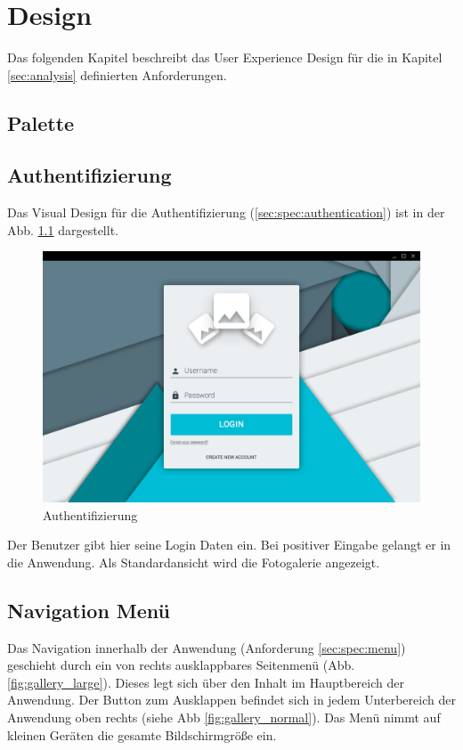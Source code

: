 \chapter{Design}

Das folgenden Kapitel beschreibt das User Experience Design für die in Kapitel \ref{sec:analysis} definierten Anforderungen.

\section{Palette}

\section{Authentifizierung}

Das Visual Design für die Authentifizierung (\ref{sec:spec:authentication}) ist in der Abb. \ref{fig:login_form} dargestellt.

\begin{figure}[htp]     %
\centering
\includegraphics[width=1.0\textwidth]{images/login_form} 
\caption{Authentifizierung}\label{fig:login_form}
\end{figure}

Der Benutzer gibt hier seine Login Daten ein. Bei positiver Eingabe gelangt er in die Anwendung. Als Standardansicht wird die Fotogalerie angezeigt.

\section{Navigation Menü}
\label{sec:des:navigation_menu}

Das Navigation innerhalb der Anwendung (Anforderung \ref{sec:spec:menu}) geschieht durch ein von rechts ausklappbares Seitenmenü (Abb. \ref{fig:gallery_large}). Dieses legt sich über den Inhalt im Hauptbereich der Anwendung. Der Button zum Ausklappen befindet sich in jedem Unterbereich der Anwendung oben rechts (siehe Abb \ref{fig:gallery_normal}). Das Menü nimmt auf kleinen Geräten die gesamte Bildschirmgröße ein.

